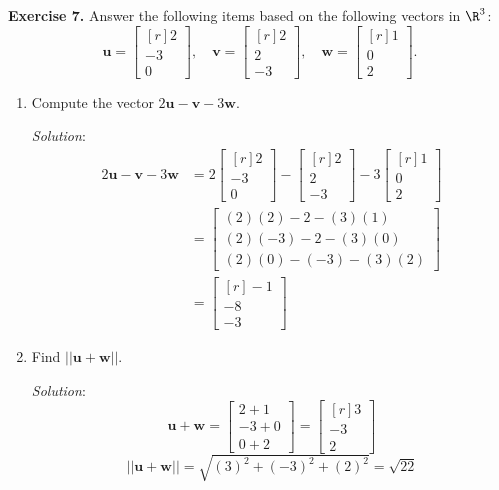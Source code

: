\documentclass[12pt]{article}
\begin{document}
\textbf{Exercise 7.} Answer the following items based on the following vectors in $\R^3$:
\[
\mathbf{u}=\begin{bmatrix*}[r] 2\\ -3\\ 0\end{bmatrix*},\quad
\mathbf{v}=\begin{bmatrix*}[r] 2\\ 2\\ -3\end{bmatrix*},\quad
\mathbf{w}=\begin{bmatrix*}[r] 1\\ 0\\  2\end{bmatrix*}.
\]

\begin{enumerate} 

\item Compute the vector $2\mathbf{u}-\mathbf{v}-3\mathbf{w}$.

\emph{Solution}:
\begin{align*}
2\mathbf{u}-\mathbf{v}-3\mathbf{w}&=
2\begin{bmatrix*}[r] 2\\ -3\\ 0\end{bmatrix*}
-\begin{bmatrix*}[r] 2\\ 2\\ -3\end{bmatrix*}
-3\begin{bmatrix*}[r] 1\\ 0\\  2\end{bmatrix*}\\
&=
\begin{bmatrix}
(2)(2)-2-(3)(1)\\(2)(-3)-2-(3)(0)\\(2)(0)-(-3)-(3)(2)
\end{bmatrix}\\
&=\begin{bmatrix*}[r]-1\\-8\\-3\end{bmatrix*}
\end{align*}
\proofend

\item Find $||\mathbf{u}+\mathbf{w}||$.

\emph{Solution}:
\[
\mathbf{u}+\mathbf{w}=
\begin{bmatrix} 2+1\\-3+0\\0+2\end{bmatrix}=
\begin{bmatrix*}[r] 3\\-3\\2\end{bmatrix*}
\]
\[
||\mathbf{u}+\mathbf{w}||=\sqrt{(3)^2+(-3)^2+(2)^2}=\sqrt{22}
\]
\proofend


\end{enumerate}
\end{document}
